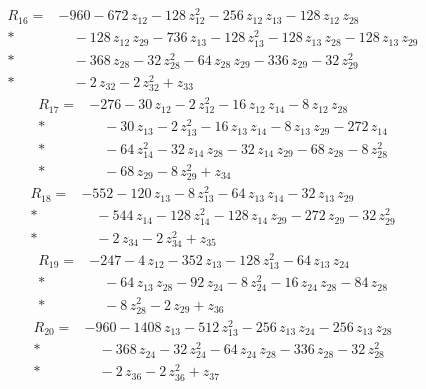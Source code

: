\documentclass[10pt]{article}
\begin{document}
\begin{align*}
R_{16}={}& - 960 - 672\,z_{12} - 128\,z_{12}^{2} - 256\,z_{12}\,z_{13} - 128\,z_{12}\,z_{28} \\*
&\quad - 128\,z_{12}\,z_{29} - 736\,z_{13} - 128\,z_{13}^{2} - 128\,z_{13}\,z_{28} - 128\,z_{13}\,z_{29} \\*
&\quad - 368\,z_{28} - 32\,z_{28}^{2} - 64\,z_{28}\,z_{29} - 336\,z_{29} - 32\,z_{29}^{2} \\*
&\quad - 2\,z_{32} - 2\,z_{32}^{2} + z_{33}
\end{align*}
\begin{align*}
R_{17}={}& - 276 - 30\,z_{12} - 2\,z_{12}^{2} - 16\,z_{12}\,z_{14} - 8\,z_{12}\,z_{28} \\*
&\quad - 30\,z_{13} - 2\,z_{13}^{2} - 16\,z_{13}\,z_{14} - 8\,z_{13}\,z_{29} - 272\,z_{14} \\*
&\quad - 64\,z_{14}^{2} - 32\,z_{14}\,z_{28} - 32\,z_{14}\,z_{29} - 68\,z_{28} - 8\,z_{28}^{2} \\*
&\quad - 68\,z_{29} - 8\,z_{29}^{2} + z_{34}
\end{align*}
\begin{align*}
R_{18}={}& - 552 - 120\,z_{13} - 8\,z_{13}^{2} - 64\,z_{13}\,z_{14} - 32\,z_{13}\,z_{29} \\*
&\quad - 544\,z_{14} - 128\,z_{14}^{2} - 128\,z_{14}\,z_{29} - 272\,z_{29} - 32\,z_{29}^{2} \\*
&\quad - 2\,z_{34} - 2\,z_{34}^{2} + z_{35}
\end{align*}
\begin{align*}
R_{19}={}& - 247 - 4\,z_{12} - 352\,z_{13} - 128\,z_{13}^{2} - 64\,z_{13}\,z_{24} \\*
&\quad - 64\,z_{13}\,z_{28} - 92\,z_{24} - 8\,z_{24}^{2} - 16\,z_{24}\,z_{28} - 84\,z_{28} \\*
&\quad - 8\,z_{28}^{2} - 2\,z_{29} + z_{36}
\end{align*}
\begin{align*}
R_{20}={}& - 960 - 1408\,z_{13} - 512\,z_{13}^{2} - 256\,z_{13}\,z_{24} - 256\,z_{13}\,z_{28} \\*
&\quad - 368\,z_{24} - 32\,z_{24}^{2} - 64\,z_{24}\,z_{28} - 336\,z_{28} - 32\,z_{28}^{2} \\*
&\quad - 2\,z_{36} - 2\,z_{36}^{2} + z_{37}
\end{align*}
\end{document}
